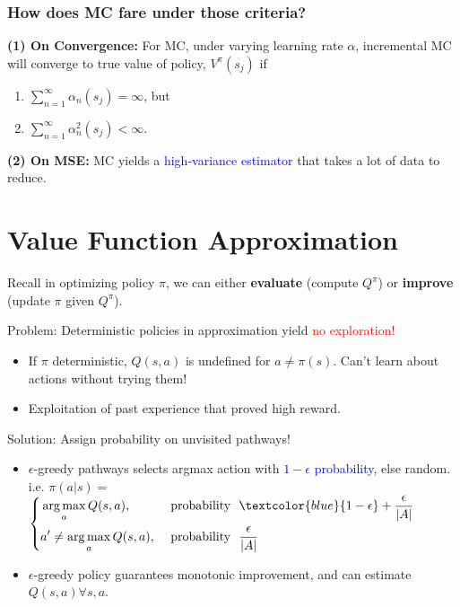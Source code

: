 \documentclass{article}
\begin{document}
\subsubsection{How does MC fare under those criteria?}
\textbf{(1) On Convergence:}
For MC, under varying learning rate $\alpha$, incremental MC will converge to true value of policy, $V^{\pi}(s_j)$ if 
\begin{enumerate}
\item $\sum_{n = 1}^{\infty} \alpha_n (s_j) = \infty$, but
\item $\sum_{n = 1}^{\infty} \alpha_n^{2} (s_j) < \infty$.
\end{enumerate}

\textbf{(2) On MSE:}
MC yields a \textcolor{blue}{high-variance estimator} that takes a lot of data to reduce.

\section{Value Function Approximation}
Recall in optimizing policy $\pi$, we can either \textbf{evaluate} (compute $Q^{\pi}$) or \textbf{improve} (update $\pi$ given $Q^{\pi}$).

Problem: Deterministic policies in approximation yield \textcolor{red}{no exploration!}
\begin{itemize}
\item If $\pi$ deterministic, $Q(s, a)$ is undefined for $a \neq \pi(s)$. Can't learn about actions without trying them!
\item Exploitation of past experience that proved high reward. 
\end{itemize}

Solution: Assign probability on unvisited pathways!
\begin{itemize}
\item $\epsilon$-greedy pathways selects argmax action with \textcolor{blue}{$1-\epsilon$ probability}, else random. i.e.
    $\pi(a | s) =$$ 
    \left\{
    \begin{aligned}
        &\mathop{\arg\max}\limits_{a} Q(s, a), & ~\text{probability}~~ & \textcolor{blue}{1 - \epsilon} + \frac{\epsilon}{|A|} &\\
        &a' \neq \mathop{\arg\max}\limits_{a} Q(s, a), & ~\text{probability}~~ & \frac{\epsilon}{|A|} &\\
    \end{aligned}
    \right.$
\item $\epsilon$-greedy policy guarantees monotonic improvement, and can estimate $Q(s, a) \forall s, a$.
\end{itemize}
\end{document}
